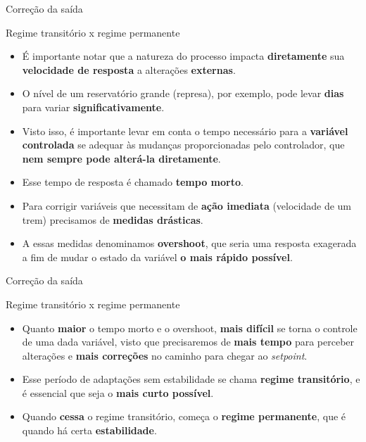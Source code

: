 \begin{frame}{Correção da saída}
	\begin{block}{Regime transitório x regime permanente}
		\begin{itemize}
			\item É importante notar que a natureza do processo impacta \textbf{diretamente} sua \textbf{velocidade de resposta} a alterações \textbf{externas}.
			\item O nível de um reservatório grande (represa), por exemplo, pode levar \textbf{dias} para variar \textbf{significativamente}.
			\item Visto isso, é importante levar em conta o tempo necessário para a \textbf{variável controlada} se adequar às mudanças proporcionadas pelo controlador, que \textbf{nem sempre pode alterá-la diretamente}.
			\item Esse tempo de resposta é chamado \textbf{tempo morto}.
			\item Para corrigir variáveis que necessitam de \textbf{ação imediata} (velocidade de um trem) precisamos de \textbf{medidas drásticas}.
			\item A essas medidas denominamos \textbf{overshoot}, que seria uma resposta exagerada a fim de mudar o estado da variável \textbf{o mais rápido possível}.
		\end{itemize}
	\end{block}
\end{frame}


\begin{frame}{Correção da saída}
	\begin{block}{Regime transitório x regime permanente}
		\begin{itemize}
			\item Quanto \textbf{maior} o tempo morto e o overshoot, \textbf{mais difícil} se torna o controle de uma dada variável, visto que precisaremos de \textbf{mais tempo} para perceber alterações e \textbf{mais correções} no caminho para chegar ao \textit{setpoint}.
			\item Esse período de adaptações sem estabilidade se chama \textbf{regime transitório}, e é essencial que seja o \textbf{mais curto possível}.
			\item Quando \textbf{cessa} o regime transitório, começa o \textbf{regime permanente}, que é quando há certa \textbf{estabilidade}.
		\end{itemize}
	\end{block}
\end{frame}


